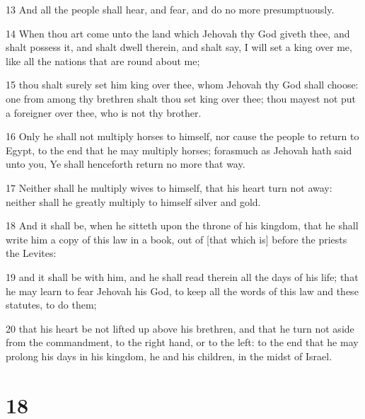 \par 13 And all the people shall hear, and fear, and do no more presumptuously.
\par 14 When thou art come unto the land which Jehovah thy God giveth thee, and shalt possess it, and shalt dwell therein, and shalt say, I will set a king over me, like all the nations that are round about me;
\par 15 thou shalt surely set him king over thee, whom Jehovah thy God shall choose: one from among thy brethren shalt thou set king over thee; thou mayest not put a foreigner over thee, who is not thy brother.
\par 16 Only he shall not multiply horses to himself, nor cause the people to return to Egypt, to the end that he may multiply horses; forasmuch as Jehovah hath said unto you, Ye shall henceforth return no more that way.
\par 17 Neither shall he multiply wives to himself, that his heart turn not away: neither shall he greatly multiply to himself silver and gold.
\par 18 And it shall be, when he sitteth upon the throne of his kingdom, that he shall write him a copy of this law in a book, out of [that which is] before the priests the Levites:
\par 19 and it shall be with him, and he shall read therein all the days of his life; that he may learn to fear Jehovah his God, to keep all the words of this law and these statutes, to do them;
\par 20 that his heart be not lifted up above his brethren, and that he turn not aside from the commandment, to the right hand, or to the left: to the end that he may prolong his days in his kingdom, he and his children, in the midst of Israel.

\chapter{18}

